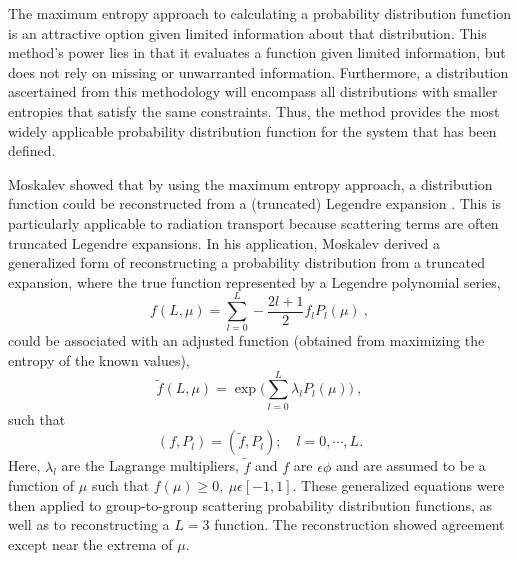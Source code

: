 The maximum entropy approach to calculating a probability distribution function
is an attractive option given limited information about that
distribution. This method's power lies in that it
evaluates a function given limited information, but does not rely on missing or unwarranted information. Furthermore, a distribution
ascertained from this methodology will encompass all distributions with smaller
entropies that satisfy the same constraints. Thus, the method provides the most widely
applicable probability distribution function for the system that has been
defined.

Moskalev showed that by using the maximum entropy approach, a distribution function
could be reconstructed from a (truncated) Legendre expansion
\cite{moskalev_reconstruction_1993}. This is particularly
applicable to radiation transport because scattering terms are often truncated
Legendre expansions. In his application, Moskalev derived a generalized form of
reconstructing a probability distribution from a truncated expansion, where the
true function represented by a Legendre polynomial series,
\begin{equation}
  f(L,\mu) = \sum_{l=0}^L -\frac{2l+1}{2} f_l P_l(\mu)\:,
\end{equation}
could be associated with an adjusted function (obtained from maximizing the
entropy of the known values),
\begin{equation}
  \tilde{f}(L,\mu) = \exp \big( \sum_{l=0}^{L} \lambda_l P_l(\mu) \big)\:,
\end{equation}
such that
\begin{equation}
  (f,P_l) = (\tilde{f}, P_l); \quad l = 0, \cdots, L .
\end{equation}
Here, $\lambda_l$ are the Lagrange multipliers, $\tilde{f}$ and $f$ are
$\epsilon \phi$ 
and are assumed to be a function of $\mu$ such that $f(\mu)
\geq 0, \: \mu \epsilon [-1, 1]$.
These generalized equations were then applied to
group-to-group scattering probability distribution functions, as well as to
reconstructing a $L=3$ function. The reconstruction showed agreement except near
the extrema of $\mu$.

